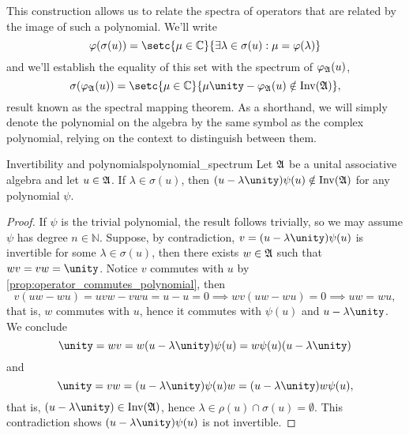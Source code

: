 This construction allows us to relate the spectra of operators that are related by the image of such a polynomial. We'll write
\begin{equation*}
    \varphi(\sigma(u)) = \setc{\mu \in \mathbb{C}}{\exists \lambda \in \sigma(u) : \mu = \varphi(\lambda)}
\end{equation*}
and we'll establish the equality of this set with the spectrum of \(\varphi_{\mathfrak{A}}(u)\),
\begin{equation*}
    \sigma(\varphi_\algebra{A}(u)) = \setc{\mu \in \mathbb{C}}{\mu \unity - \varphi_\algebra{A}(u) \notin \invertible{\algebra{A}}},
\end{equation*}
result known as the spectral mapping theorem.
As a shorthand, we will simply denote the polynomial on the algebra by the same symbol as the complex polynomial, relying on the context to distinguish between them.
\begin{lemma}{Invertibility and polynomials}{polynomial_spectrum}
    Let \(\mathfrak{A}\) be a unital associative algebra and let \(u \in \mathfrak{A}\). If \(\lambda \in \sigma(u)\), then \((u - \lambda \unity)\psi(u) \notin \invertible{\algebra{A}}\) for any polynomial \(\psi\).
\end{lemma}
\begin{proof}
    If \(\psi\) is the trivial polynomial, the result follows trivially, so we may assume \(\psi\) has degree \(n \in \mathbb{N}\). Suppose, by contradiction, \(v = (u - \lambda \unity)\psi(u)\) is invertible for some \(\lambda \in \sigma(u)\), then there exists \(w \in \mathfrak{A}\) such that \(wv = vw = \unity\). Notice \(v\) commutes with \(u\) by \cref{prop:operator_commutes_polynomial}, then
    \begin{equation*}
        v (uw - wu) = uvw - vw u = u - u = 0 \implies w v( uw - wu) = 0 \implies uw = wu,
    \end{equation*}
    that is, \(w\) commutes with \(u\), hence it commutes with \(\psi(u)\) and \(u - \lambda \unity\). We conclude
    \begin{equation*}
        \unity = wv = w(u - \lambda \unity) \psi(u) = w \psi(u) (u - \lambda \unity)
    \end{equation*}
    and
    \begin{equation*}
        \unity = vw = (u - \lambda \unity) \psi(u) w = (u - \lambda \unity)w \psi(u),
    \end{equation*}
    that is, \((u - \lambda \unity) \in \invertible{\algebra{A}}\), hence \(\lambda \in \rho(u)\cap \sigma(u) = \emptyset\). This contradiction shows \((u - \lambda \unity)\psi(u)\) is not invertible.
\end{proof}
